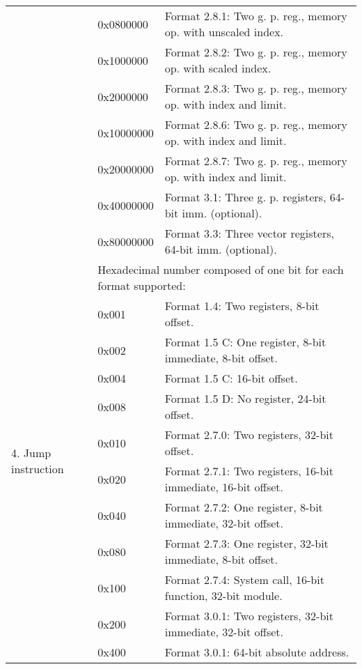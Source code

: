 \documentclass[forwardcom.tex]{subfiles}
\begin{document}
\begin{longtable} {|p{18mm}|p{14mm} p{80mm}|}
  &  0x0800000 & Format 2.8.1: Two g. p. reg., memory op. with unscaled index. \\
  &  0x1000000 & Format 2.8.2: Two g. p. reg., memory op. with scaled index. \\
  &  0x2000000 & Format 2.8.3: Two g. p. reg., memory op. with index and limit.\\  
  & 0x10000000 & Format 2.8.6: Two g. p. reg., memory op. with index and limit.\\
  & 0x20000000 & Format 2.8.7: Two g. p. reg., memory op. with index and limit.\\  
  & 0x40000000 & Format 3.1: Three g. p. registers, 64-bit imm. (optional). \\
  & 0x80000000 & Format 3.3: Three vector registers, 64-bit imm. (optional). \\
\hline
\multirow{12}{*}{\parbox[t]{18mm}{4. Jump instruction}} 
  &  \multicolumn{2}{|l|}{
     Hexadecimal number composed of one bit for each format supported:} \\
  &  0x001 & Format 1.4: Two registers, 8-bit offset. \\
  &  0x002 & Format 1.5 C: One register, 8-bit immediate, 8-bit offset. \\
  &  0x004 & Format 1.5 C: 16-bit offset. \\
  &  0x008 & Format 1.5 D: No register, 24-bit offset. \\
  &  0x010 & Format 2.7.0: Two registers, 32-bit offset. \\
  &  0x020 & Format 2.7.1: Two registers, 16-bit immediate, 16-bit offset. \\
  &  0x040 & Format 2.7.2: One register, 8-bit immediate, 32-bit offset. \\
  &  0x080 & Format 2.7.3: One register, 32-bit immediate, 8-bit offset. \\
  &  0x100 & Format 2.7.4: System call, 16-bit function, 32-bit module. \\
  &  0x200 & Format 3.0.1: Two registers, 32-bit immediate, 32-bit offset. \\
  &  0x400 & Format 3.0.1: 64-bit absolute address. \\
\hline
\end{longtable}
\end{document}
